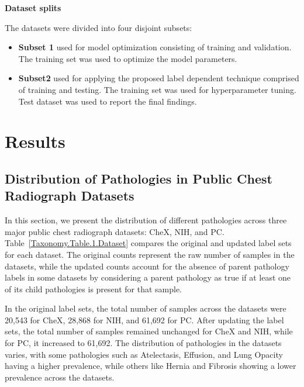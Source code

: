 \textbf{Dataset splits}

The datasets were divided into four disjoint subsets:

\begin{itemize}
    \item \textbf{Subset 1} used for model optimization consisting of training and validation. The training set was used to optimize the model parameters.
    \item \textbf{Subset2} used for applying the proposed label dependent technique comprised of training and testing. The training set was used for hyperparameter tuning. Test dataset was used to report the final findings.
\end{itemize}


\section{Results}

\subsection{Distribution of Pathologies in Public Chest Radiograph Datasets}

In this section, we present the distribution of different pathologies across three major public chest radiograph datasets: CheX, NIH, and PC\@. Table~\ref*{Taxonomy.Table.1.Dataset} compares the original and updated label sets for each dataset. The original counts represent the raw number of samples in the datasets, while the updated counts account for the absence of parent pathology labels in some datasets by considering a parent pathology as true if at least one of its child pathologies is present for that sample.

In the original label sets, the total number of samples across the datasets were 20,543 for CheX, 28,868 for NIH, and 61,692 for PC\@. After updating the label sets, the total number of samples remained unchanged for CheX and NIH, while for PC, it increased to 61,692. The distribution of pathologies in the datasets varies, with some pathologies such as Atelectasis, Effusion, and Lung Opacity having a higher prevalence, while others like Hernia and Fibrosis showing a lower prevalence across the datasets.


